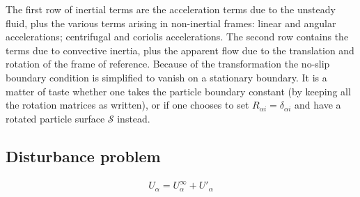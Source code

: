 \documentclass[thesis.tex]{subfiles}
\begin{document}
The first row of inertial terms are the acceleration terms due to the unsteady fluid, plus the various terms arising in non-inertial frames: linear and angular accelerations; centrifugal and coriolis accelerations. The second row contains the terms due to convective inertia, plus the apparent flow due to the translation and rotation of the frame of reference. Because of the transformation the no-slip boundary condition is simplified to vanish on a stationary boundary. It is a matter of taste whether one takes the particle boundary constant (by keeping all the rotation matrices as written), or if one chooses to set $R_{\alpha i} = \delta_{\alpha i}$ and have a rotated particle surface $\mathcal S$ instead.
\subsection{Disturbance problem}
\begin{align}
	U_\alpha = U^\infty_\alpha + U'_\alpha
\end{align}
\end{document}
